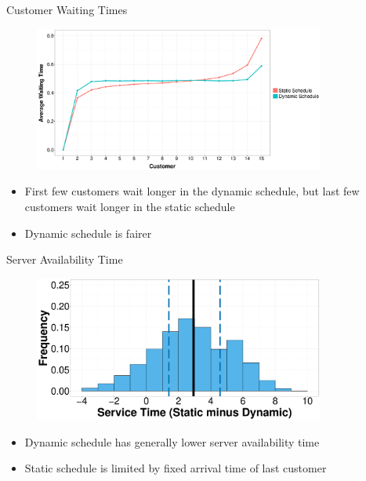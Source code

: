 \documentclass{beamer}
\begin{document}
\begin{frame}{Customer Waiting Times}
	\begin{figure}
			\centering
			\includegraphics[width=0.85\textwidth]{WT_Line_Avg.eps}
	\end{figure}
		
	\begin{itemize}
		\item First few customers wait longer in the dynamic schedule, but last few customers wait longer in the static schedule
		\item Dynamic schedule is fairer
	\end{itemize}
\end{frame}

\begin{frame}{Server Availability Time}
	\begin{figure}
		\centering
		\includegraphics[width=0.85\textwidth]{TST_Hist_Diff.eps}
	\end{figure}

	\begin{itemize}
		\item Dynamic schedule has generally lower server availability time
		\item Static schedule is limited by fixed arrival time of last customer
	\end{itemize}
\end{frame}
\end{document}
